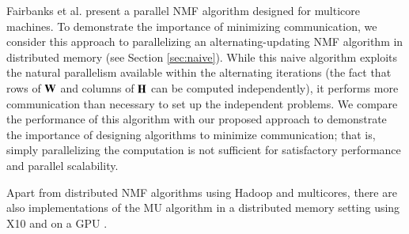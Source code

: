 Fairbanks et al. \cite{Fairbanks2015} present a parallel NMF algorithm designed for multicore machines.  
To demonstrate the importance of minimizing communication, we consider this approach to parallelizing an alternating-updating NMF algorithm in distributed memory (see Section \ref{sec:naive}).
While this naive algorithm exploits the natural parallelism available within the alternating iterations (the fact that rows of $\mathbf{W}$ and columns of $\mathbf{H}$ can be computed independently), it performs more communication than necessary to set up the independent problems.
We compare the performance of this algorithm with our proposed approach to demonstrate the importance of designing algorithms to minimize communication; that is, simply parallelizing the computation is not sufficient for satisfactory performance and parallel scalability.

Apart from distributed NMF algorithms using Hadoop and multicores, there are also implementations of the
MU algorithm in a distributed memory setting using X10 \cite{Grove2014} and on a GPU \cite{mejia2015nmf}. 

